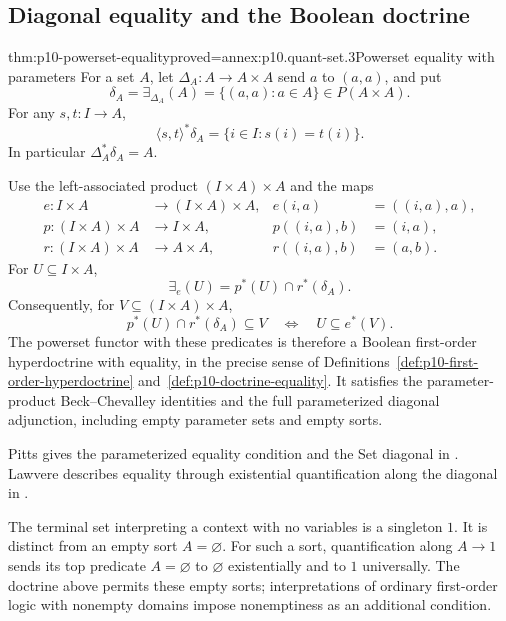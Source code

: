 \subsection{Diagonal equality and the Boolean doctrine}
\label{sec:p10-powerset-equality}

\begin{hbtheorem}{thm:p10-powerset-equality}{proved=annex:p10.quant-set.3}{Powerset equality with parameters}
For a set \(A\), let \(\Delta_A:A\to A\times A\) send
\(a\) to \((a,a)\), and put
\[
              \delta_A=\exists_{\Delta_A}(A)
                         =\{(a,a):a\in A\}\in P(A\times A).
\]
For any \(s,t:I\to A\),
\[
             \langle s,t\rangle^*\delta_A
                        =\{i\in I:s(i)=t(i)\}.
\]
In particular \(\Delta_A^*\delta_A=A\).

Use the left-associated product \((I\times A)\times A\)
and the maps
\[
\begin{aligned}
 e:I\times A&\longrightarrow(I\times A)\times A,
                         &e(i,a)&=((i,a),a),\\
 p:(I\times A)\times A&\longrightarrow I\times A,
                         &p((i,a),b)&=(i,a),\\
 r:(I\times A)\times A&\longrightarrow A\times A,
                         &r((i,a),b)&=(a,b).
\end{aligned}
\]
For \(U\subseteq I\times A\),
\[
                    \exists_e(U)=p^*(U)\cap r^*(\delta_A).
\]
Consequently, for \(V\subseteq(I\times A)\times A\),
\[
       p^*(U)\cap r^*(\delta_A)\subseteq V
                   \quad\Longleftrightarrow\quad U\subseteq e^*(V).
\]
The powerset functor with these predicates is therefore a
Boolean first-order hyperdoctrine with equality, in the precise
sense of Definitions~\ref{def:p10-first-order-hyperdoctrine}
and~\ref{def:p10-doctrine-equality}.
It satisfies the parameter-product Beck--Chevalley identities
and the full parameterized diagonal adjunction, including
empty parameter sets and empty sorts.
\end{hbtheorem}

Pitts gives the parameterized equality condition and the Set
diagonal in
\cite[\S5.6, equation~(5.12), Definition~5.6.1, and
Example~5.6.3, pp.~55--56]{Pitts1995Draft}.
Lawvere describes equality through existential quantification
along the diagonal in
\cite[p.~12]{Lawvere2006AdjointnessReprint}.

The terminal set interpreting a context with no variables is
a singleton \(1\).  It is distinct from an empty sort \(A=\varnothing\).
For such a sort, quantification along \(A\to1\) sends its top
predicate \(A=\varnothing\) to \(\varnothing\) existentially
and to \(1\) universally.
The doctrine above permits these empty sorts; interpretations
of ordinary first-order logic with nonempty domains impose
nonemptiness as an additional condition.
